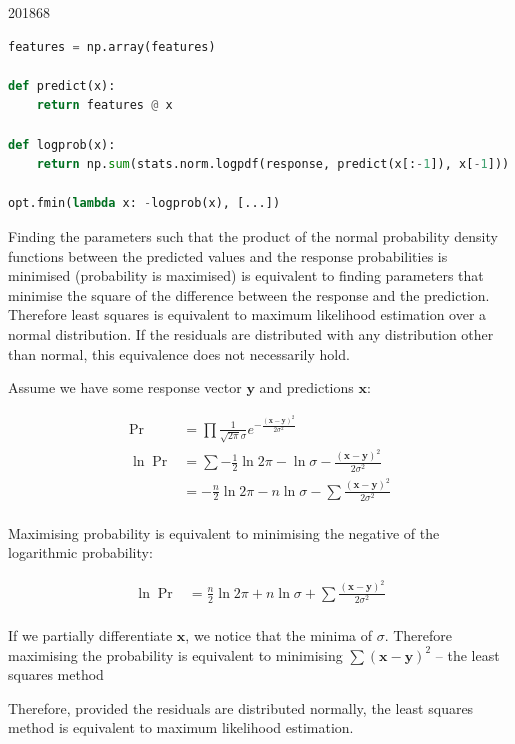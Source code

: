 \documentclass[10pt,\jkfside,a4paper]{article}
\begin{document}
\begin{examquestion}{2018}{6}{8}
\begin{enumerate}[label=(\alph*)]
\begin{lstlisting}[language=Python]
features = np.array(features)

def predict(x):
	return features @ x

def logprob(x):
	return np.sum(stats.norm.logpdf(response, predict(x[:-1]), x[-1]))

opt.fmin(lambda x: -logprob(x), [...])

\end{lstlisting}

Finding the parameters such that the product of the normal probability density
functions between the predicted values and the response probabilities is
minimised (probability is maximised) is equivalent to finding parameters
that minimise the square of the difference between the response and the
prediction. Therefore least squares is equivalent to maximum likelihood
estimation over a normal distribution. If the residuals are distributed with
any distribution other than normal, this equivalence does not necessarily hold.

Assume we have some response vector $\mathbf{y}$ and predictions $\mathbf{x}$:

\[
\begin{split}
\Pr &= \prod \frac{1}{\sqrt{2\pi}\sigma} e^{-\frac{(\mathbf{x} - \mathbf{y})
^2}{2\sigma^2}} \\
\ln \Pr &= \sum -\frac{1}{2}\ln 2\pi - \ln \sigma - \frac{(\mathbf{x} -
\mathbf{y})^2}{2\sigma^2} \\
&= -\frac{n}{2}\ln 2\pi - n\ln \sigma - \sum\frac{(\mathbf{x} - \mathbf{y})
^2}{2\sigma^2} \\
\end{split}
\]

Maximising probability is equivalent to minimising the negative of the
logarithmic probability:

\[
\begin{split}
\ln\Pr &= \frac{n}{2}\ln 2\pi + n\ln \sigma + \sum\frac{(\mathbf{x} -
\mathbf{y})^2}{2\sigma^2} \\
\end{split}
\]

If we partially differentiate $\mathbf{x}$, we notice that the minima
of $\sigma$. Therefore maximising the probability is equivalent to
minimising $\sum(\mathbf{x} - \mathbf{y})^2$ -- the least squares method

Therefore, provided the residuals are distributed normally, the least
squares method is equivalent to maximum likelihood estimation.

\iffalse %


\end{enumerate}
\end{examquestion}
\end{document}
